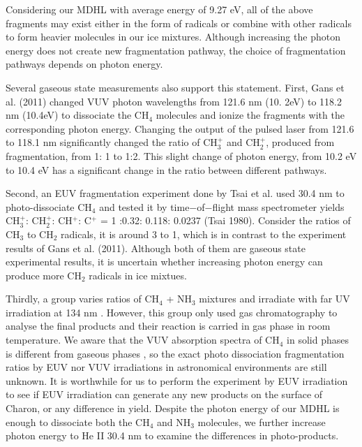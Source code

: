 Considering our MDHL with average energy of 9.27 eV, all of the above fragments may exist either in the form of radicals or combine with other radicals to form heavier molecules in our ice mixtures. Although increasing the photon energy does not create new fragmentation pathway, the choice of fragmentation pathways depends on photon energy.

Several gaseous state measurements also support this statement. First, Gans et al. (2011) \cite{gans2011photolysis} changed VUV photon wavelengths from 121.6 nm (10. 2eV) to 118.2 nm (10.4eV) to dissociate the CH$_4$ molecules and ionize the fragments with the corresponding photon energy. Changing the output of the pulsed laser from 121.6 to 118.1 nm significantly changed the ratio of CH$_3^+$ and CH$_2^+$, produced from fragmentation, from 1: 1 to 1:2. This slight change of photon energy, from 10.2 eV to 10.4 eV has a significant change in the ratio between different pathways.

Second, an EUV fragmentation experiment done by Tsai et al. \cite{tsai1980mass} used 30.4 nm to photo-dissociate CH$_4$ and tested it by time$-$of$-$flight mass spectrometer yields CH$_3^+$: CH$_2^+$: CH$^+$: C$^+$ = 1 :0.32: 0.118: 0.0237 (Tsai 1980). Consider the ratios of CH$_3$ to CH$_2$ radicals, it is around 3 to 1, which is in contrast to the experiment results of Gans et al. (2011)\cite{gans2011photolysis}. Although both of them are gaseous state experimental results, it is uncertain whether increasing photon energy can produce more CH$_2$ radicals in ice mixtues.

Thirdly, a group varies ratios of CH$_4$ + NH$_3$ mixtures and irradiate with far UV irradiation at 134 nm \cite{bossard1980far}. However, this group only used gas chromatography to analyse the final products and their reaction is carried in gas phase in room temperature. We aware that the VUV absorption spectra of CH$_4$ in solid phases is different from gaseous phases \cite{cruz2014vacuum}, so the exact photo dissociation fragmentation ratios by EUV nor VUV irradiations in astronomical environments are still unknown. It is worthwhile for us to perform the experiment by EUV irradiation to see if  EUV irradiation can generate any new products on the surface of Charon, or any difference in yield. Despite the photon energy of our MDHL is enough to dissociate both the CH$_4$ and NH$_3$ molecules, we further increase photon energy to He II 30.4 nm to examine the differences in photo-products. 

